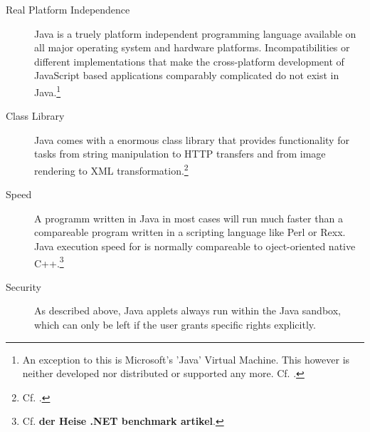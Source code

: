 \begin{description}
	
	\item [Real Platform Independence] Java is a truely platform independent programming language available on all major operating system and hardware platforms. Incompatibilities or different implementations that make the cross-platform development of JavaScript based applications comparably complicated do not exist in Java.\footnote{An exception to this is Microsoft's 'Java' Virtual Machine. This however is neither developed nor distributed or supported any more. Cf. \cite{MSJavaT}.}
	
	\item [Class Library] Java comes with a enormous class library that provides functionality for tasks from string manipulation to HTTP transfers and from image rendering to XML transformation.\footnote{Cf. \cite{JavaAPI}.}
	
	\item [Speed] A programm written in Java in most cases will run much faster than a compareable program written in a scripting language like Perl or Rexx. Java execution speed for is normally compareable to oject-oriented native C++.\footnote{Cf. \textbf{der Heise .NET benchmark artikel}.}
	
	\item [Security] As described above, Java applets always run within the Java sandbox, which can only be left if the user grants specific rights explicitly.
	
\end{description}